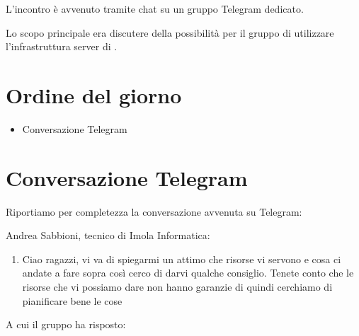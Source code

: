\documentclass{article}
\begin{document}
L'incontro è avvenuto tramite chat su un gruppo Telegram dedicato.

Lo scopo principale era discutere della possibilità per il gruppo di utilizzare l'infrastruttura server di .

\section{Ordine del giorno}%
\label{sec:ordine_del_giorno}

\begin{itemize}
  \item Conversazione Telegram
\end{itemize}

\section{Conversazione Telegram}%
\label{sec:conversazione_telegram}

Riportiamo per completezza la conversazione avvenuta su Telegram:

Andrea Sabbioni, tecnico di Imola Informatica:
\begin{enumerate}

\item Ciao ragazzi, vi va di spiegarmi un attimo che risorse vi servono e cosa ci andate a fare sopra così cerco di darvi qualche consiglio. Tenete conto che le risorse che vi possiamo dare non hanno garanzie di  quindi cerchiamo di pianificare bene le cose
\end{enumerate}

A cui il gruppo ha risposto:
\end{document}
